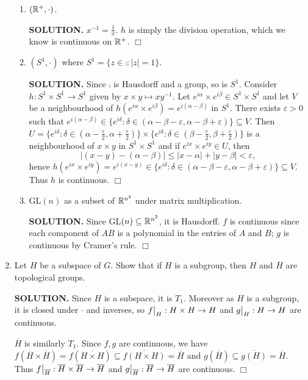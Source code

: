 \documentclass{article}
\begin{document}
\begin{enumerate}
\begin{enumerate}
        \item $(\mathbb{R}^+, \cdot)$.

        {\bf SOLUTION.} $x^{-1} = \frac1x$. $h$ is simply the division operation, which we know is continuous on $\mathbb{R}^+$. $\Box$
        
        \item $(S^1, \cdot)$ where $S^1 = \{z \in \comp: |z| = 1\}$.

        {\bf SOLUTION.} Since $\comp$ is Hausdorff and a group, so is $S^1$. Consider $h: S^1 \times S^1 \rightarrow S^1$ given by $x \times y \mapsto x y^{-1}$. Let $e^{i \alpha} \times e^{i \beta} \in S^1 \times S^1$ and let $V$ be a neighbourhood of $h(e^{i\alpha} \times e^{i\beta}) = e^{i(\alpha - \beta)}$ in $S^1$. There exists $\varepsilon > 0$ such that $e^{i(\alpha - \beta)} \in \{e^{i \delta}: \delta \in (\alpha - \beta - \varepsilon, \alpha - \beta + \varepsilon)\} \subseteq V$. Then $U = \{e^{i \delta}: \delta \in (\alpha - \frac{\varepsilon}{2}, \alpha + \frac{\varepsilon}{2})\} \times \{e^{i \delta}: \delta \in (\beta - \frac{\varepsilon}{2}, \beta + \frac{\varepsilon}{2})\}$ is a neighbourhood of $x \times y$ in $S^1 \times S^1$ and if $e^{ix} \times e^{iy} \in U$, then
        $$|(x-y )- (\alpha - \beta)| \leq |x - \alpha| + |y - \beta| < \varepsilon,$$
        hence $h(e^{ix} \times e^{iy}) = e^{i(x - y)} \in \{e^{i \delta}: \delta \in (\alpha - \beta - \varepsilon, \alpha - \beta + \varepsilon)\} \subseteq V$. Thus $h$ is continuous. $\Box$
        
        \item GL$(n)$ as a subset of $\mathbb{R}^{n^2}$ under matrix multiplication.

        {\bf SOLUTION.} Since GL$(n) \subseteq \mathbb{R}^{n^2}$, it is Hausdorff. $f$ is continuous since each component of $AB$ is a polynomial in the entries of $A$ and $B$; $g$ is continuous by Cramer's rule. $\Box$
    \end{enumerate}

    \item Let $H$ be a subspace of $G$. Show that if $H$ is a subgroup, then $H$ and $\overline{H}$ are topological groups.

    {\bf SOLUTION.} Since $H$ is a subspace, it is $T_1$. Moreover as $H$ is a subgroup, it is closed under $\cdot$ and inverses, so $\restr{f}{H}: H \times H \rightarrow H$ and $\restr{g}{H}: H \rightarrow H$ are continuous.

    $\overline{H}$ is similarly $T_1$. Since $f, g$ are continuous, we have $f(\overline{H} \times \overline{H}) = f(\overline{H \times H}) \subseteq \overline{f(H \times H)} = \overline{H}$ and $g(\overline{H}) \subseteq \overline{g(H)} = \overline{H}$. Thus $\restr{f}{\overline{H}}: \overline{H} \times \overline{H} \rightarrow \overline{H}$ and $\restr{g}{\overline{H}}: \overline{H} \rightarrow \overline{H}$ are continuous. $\Box$


\end{enumerate}
\end{document}
